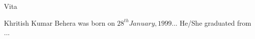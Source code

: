 \vspace*{0.5mm}
\begin{center}
\large{Vita}
\end{center}

\vspace*{1cm}
\begin{minipage}[t]{6in}
\setlength{\parindent}{0mm}
Khritish Kumar Behera was born on $28^{th} January, 1999$... He/She graduated from ...
\end{minipage}
